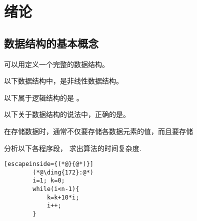 \clearpage
\clearpage
\section{绪论}
\subsection{数据结构的基本概念}
\qnum \quad {}

\begin{questions}[tr]
    \begin{bbox}
        \question[2] 可以用\blankbox 定义一个完整的数据结构。
    \end{bbox}

    \begin{bbox}
        \question[2] 以下数据结构中，\blankbox 是非线性数据结构。
    \end{bbox}

    \begin{bbox}
 
        \question[2] 以下属于逻辑结构的是 \blankbox 。
        
    \end{bbox}

 

    \begin{bbox}
        \question[2] 以下关于数据结构的说法中，正确的是\blankbox 。
    \end{bbox}

    \begin{bbox}
        \question[2] 在存储数据时，通常不仅要存储各数据元素的值，而且要存储\blankbox
    \end{bbox}

    \begin{bbox}
        \question[2] 分析以下各程序段， 求出算法的时间复杂度.
        \begin{lstlisting}[escapeinside={(*@}{@*)}]
        (*@\ding{172}:@*)
        i=1; k=0;
        while(i<n-1){
            k=k+10*i;
            i++;
        }
    

\end{lstlisting}
\end{bbox}
\end{questions}
